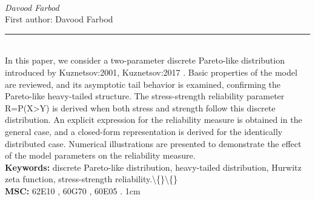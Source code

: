 \documentclass[10pt,twoside]{article}
\begin{document}
\noindent\begin{minipage}[t][\textheight]{\textwidth}
\\[0.35em]
{\itshape Davood Farbod}\\[0.2em]
{\footnotesize First author: Davood Farbod}\\[0.45em]
\noindent\rule{\textwidth}{0.3pt}\\[0.4em]
{\footnotesize  In this paper, we consider a two-parameter discrete Pareto-like distribution introduced by Kuznetsov:2001, Kuznetsov:2017 . Basic properties of the model are reviewed, and its asymptotic tail behavior is examined, confirming the Pareto-like heavy-tailed structure. The stress-strength reliability parameter R=P(X>Y) is derived when both stress and strength follow this discrete distribution. An explicit expression for the reliability measure is obtained in the general case, and a closed-form representation is derived for the identically distributed case. Numerical illustrations are presented to demonstrate the effect of the model parameters on the reliability measure.}\\[0.4em]
{\footnotesize\bfseries Keywords:} {\footnotesize discrete Pareto-like distribution, heavy-tailed distribution, Hurwitz zeta function, stress-strength reliability.\textbackslash\{\}\textbackslash\{\}}\\[0.15em]
{\footnotesize\bfseries MSC:} {\footnotesize 62E10 , 60G70 , 60E05 . 1cm}\\
\vfill
\end{minipage}
\newpage
\end{document}
